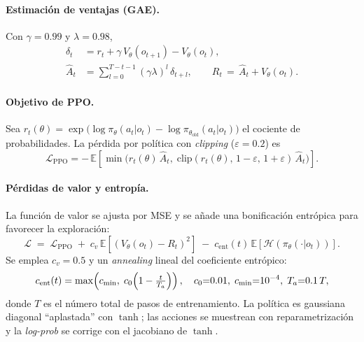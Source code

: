\documentclass[conference]{IEEEtran}
\begin{document}
\paragraph{Estimación de ventajas (GAE).}
Con $\gamma{=}0.99$ y $\lambda{=}0.98$,
\begin{align}
\delta_t &= r_t + \gamma\,V_\theta(o_{t+1}) - V_\theta(o_t),\\
\hat A_t &= \sum_{l=0}^{T-t-1} (\gamma\lambda)^l\,\delta_{t+l},\qquad
R_t \,=\, \hat A_t + V_\theta(o_t).
\end{align}

\paragraph{Objetivo de PPO.}
Sea $r_t(\theta)=\exp\!\bigl(\log\pi_\theta(a_t|o_t)-\log\pi_{\theta_{\mathrm{old}}}(a_t|o_t)\bigr)$ el cociente de probabilidades. La pérdida por política con \emph{clipping} ($\varepsilon{=}0.2$) es
\begin{equation}
\mathcal{L}_{\mathrm{PPO}}
= -\,\mathbb{E}\!\left[
\min\!\bigl(r_t(\theta)\,\hat A_t,\;
\mathrm{clip}(r_t(\theta),\,1-\varepsilon,\,1+\varepsilon)\,\hat A_t\bigr)
\right].
\end{equation}

\paragraph{Pérdidas de valor y entropía.}
La función de valor se ajusta por MSE y se añade una bonificación entrópica para favorecer la exploración:
\begin{equation}
\mathcal{L} \;=\;
\mathcal{L}_{\mathrm{PPO}}
\;+\; c_v\,\mathbb{E}\!\left[(V_\theta(o_t)-R_t)^2\right]
\;-\; c_{\mathrm{ent}}(t)\,\mathbb{E}\!\left[\mathcal{H}\!\left(\pi_\theta(\cdot|o_t)\right)\right].
\end{equation}
Se emplea $c_v{=}0.5$ y un \emph{annealing} lineal del coeficiente entrópico:
\[
c_{\mathrm{ent}}(t)=
\max\!\left(c_{\min},\; c_0\Bigl(1-\tfrac{t}{T_a}\Bigr)\right),\quad
c_0{=}0.01,\; c_{\min}{=}10^{-4},\; T_a{=}0.1\,T,
\]
donde $T$ es el número total de pasos de entrenamiento. La política es gaussiana diagonal “aplastada” con $\tanh$; las acciones se muestrean con reparametrización y la \emph{log-prob} se corrige con el jacobiano de $\tanh$.
\end{document}
